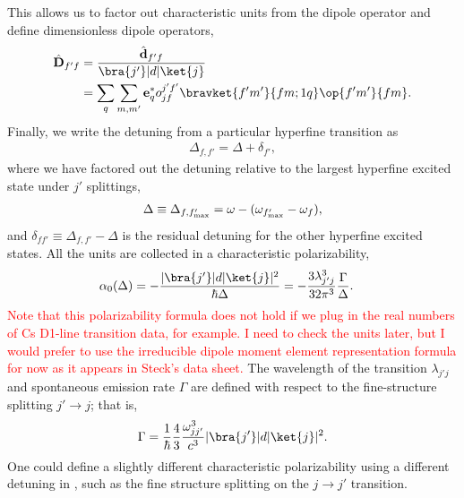 \documentclass[]{report}
\begin{document}
This allows us to factor out characteristic units from the dipole operator and define dimensionless dipole operators,
	\begin{align}
		\hat{ \mathbf{D}}_{f' f} & = \frac{ \hat{ \mathbf{d} }_{f' f} }{\bra{ j' }| d | \ket{ j } } \\
		& = \sum_q \sum_{m, m'} \mathbf{e}_q^* o^{j' f'}_{j f} \bravket{f' m'}{f m; 1 q} \op{f' m'}{f m}. 
	\end{align}
Finally, we write the detuning from a particular hyperfine transition as
	\begin{align}
		\Delta_{f,f'} = \Delta + \delta_{f'},
	\end{align}
where we have factored out the detuning relative to the largest hyperfine excited state under $ j' $ splittings,
	\begin{align} \label{Eq::DetuningChoice}
		\Delta \equiv \Delta_{f,f'_{\rm max}} = \omega - ( \omega_{f'_{\rm max}} - \omega_f),
	\end{align} 
and $\delta_{f f'} \equiv \Delta_{f,f'} - \Delta$ is the residual detuning for the other hyperfine excited states.  All the units are collected in a characteristic polarizability,
	\begin{align} \label{Eq::alpha0}
		\alpha_0(\Delta) & =  -\frac{|  \bra{ j' }| d | \ket{ j } |^2}{\hbar \Delta } = - \frac{3 \lambda_{j' j}^3}{32 \pi^3} \frac{ \Gamma }{ \Delta }.
	\end{align}
\textcolor{red}{Note that this polarizability formula does not hold if we plug in the real numbers of Cs D1-line transition data, for example. I need to check the units later, but I would prefer to use the irreducible dipole moment element representation formula for now as it appears in Steck's data sheet.} The wavelength of the transition $\lambda_{j' j}$ and spontaneous emission rate $\Gamma$ are defined with respect to the fine-structure splitting $j' \rightarrow j$; that is,
	\begin{align}
		\Gamma = \frac{1}{\hbar} \frac{4}{3} \frac{\omega_{j j'}^3}{c^3} | \bra{ j' }| d | \ket{ j } |^2.
	\end{align}
One could define a slightly different characteristic polarizability using a different detuning in , such as the fine structure splitting on the $j \rightarrow j'$ transition.
\end{document}

